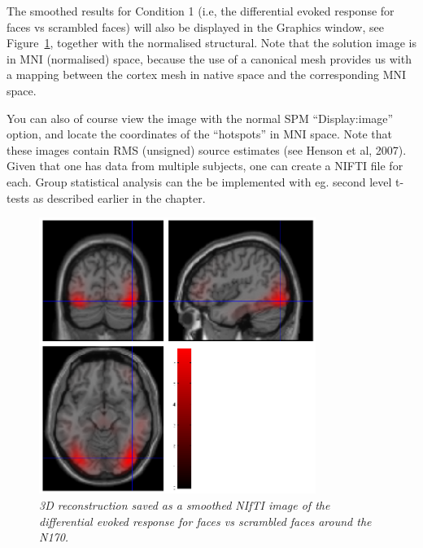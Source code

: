 The smoothed results for Condition 1 (i.e, the differential evoked response for faces vs scrambled faces) will also be displayed in the Graphics window, see Figure~\ref{multimodal:fig:eegrecon}, together with the normalised structural. Note that the solution image is in MNI (normalised) space, because the use of a canonical mesh provides us with a mapping between the cortex mesh in native space and the corresponding MNI space.

You can also of course view the image with the normal SPM ``Display:image'' option, and locate the coordinates of the ``hotspots'' in MNI space. Note that these images contain RMS (unsigned) source estimates (see Henson et al, 2007).
Given that one has data from multiple subjects, one can create a NIFTI file for each. Group statistical analysis can the be implemented with eg. second level t-tests as described earlier in the chapter.


\begin{figure}[h!t]
\begin{center}
\includegraphics[width=90mm]{multimodal/figures/eeg_recon.png}
\caption{\em 3D reconstruction saved as a smoothed NIfTI image of the differential evoked response for faces vs scrambled faces around the N170. \label{multimodal:fig:eegrecon}}
\end{center}
\end{figure}
